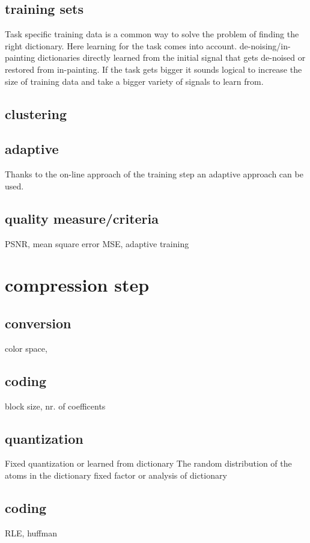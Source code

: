 \subsection{training sets}
Task specific training data is a common way to solve the problem of finding the right dictionary. 
Here learning for the task comes into account. de-noising/in-painting dictionaries directly learned from the initial
signal that gets de-noised or restored from in-painting.
If the task gets bigger it sounds logical to increase the size of training data and take a bigger variety of signals to learn from.

\subsection{clustering}

\subsection{adaptive}
Thanks to the on-line approach of the training step an adaptive approach can be used. 

\subsection{quality measure/criteria}
PSNR, mean square error MSE, adaptive training 

\section{compression step}
\subsection{conversion}
color space, 
\subsection{coding}
block size, nr. of coefficents
\subsection{quantization}
Fixed quantization or learned from dictionary
The random distribution of the atoms in the dictionary 
fixed factor or analysis of dictionary
\subsection{coding}
RLE, huffman

